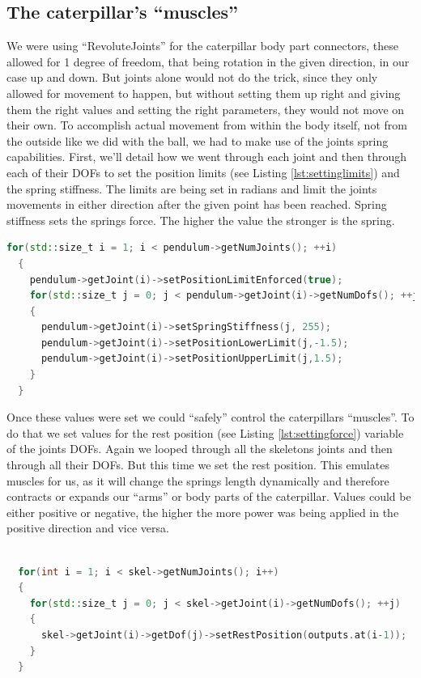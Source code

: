\documentclass[12pt,oneside,listof=totoc,paper=a4,headings=small]{scrbook}
\begin{document}
\subsection{The caterpillar's ``muscles''}
We were using ``RevoluteJoints'' for the caterpillar body part connectors, these allowed for 1 degree of freedom, that being rotation in the given direction, in our case up and down. But joints alone would not do the trick, since they only allowed for movement to happen, but without setting them up right and giving them the right values and setting the right parameters, they would not move on their own. 
To accomplish actual movement from within the body itself, not from the outside like we did with the ball, we had to make use of the joints spring capabilities.
First, we'll detail how we went through each joint and then through each of their DOFs to set the position limits (see Listing \ref{lst:settinglimits}) and the spring stiffness. The limits are being set in radians and limit the joints movements in either direction after the given point has been reached. 
Spring stiffness sets the springs force. The higher the value the stronger is the spring.

\begin{lstlisting}[language=C++, label={lst:settinglimits}, caption=Setting Limits]
  for(std::size_t i = 1; i < pendulum->getNumJoints(); ++i)
  {
    pendulum->getJoint(i)->setPositionLimitEnforced(true);
    for(std::size_t j = 0; j < pendulum->getJoint(i)->getNumDofs(); ++j)
    {
      pendulum->getJoint(i)->setSpringStiffness(j, 255);
      pendulum->getJoint(i)->setPositionLowerLimit(j,-1.5);
      pendulum->getJoint(i)->setPositionUpperLimit(j,1.5);
    }
  }
\end{lstlisting}

Once these values were set we could ``safely'' control the caterpillars ``muscles''. To do that we set values for the rest position (see Listing \ref{lst:settingforce}) variable of the joints DOFs. Again we looped through all the skeletons joints and then through all their DOFs. But this time we set the rest position. This emulates muscles for us, as it will change the springs length dynamically and therefore contracts or expands our ``arms'' or body parts of the caterpillar. Values could be either positive or negative, the higher the more power was being applied in the positive direction and vice versa.

\begin{lstlisting}[language=C++, label={lst:settingforce}, caption=Setting Force]

  for(int i = 1; i < skel->getNumJoints(); i++)
  {
    for(std::size_t j = 0; j < skel->getJoint(i)->getNumDofs(); ++j)
    {
      skel->getJoint(i)->getDof(j)->setRestPosition(outputs.at(i-1));
    }
  }
\end{lstlisting}
\end{document}
